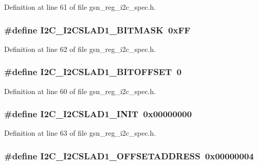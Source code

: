 Definition at line 61 of file gsn\_\-reg\_\-i2c\_\-spec.h.

\hypertarget{a00558_a4723244e82ce8c8eeae3907dbee0b0c8}{
\subsubsection[{I2C\_\-I2CSLAD1\_\-BITMASK}]{\setlength{\rightskip}{0pt plus 5cm}\#define I2C\_\-I2CSLAD1\_\-BITMASK~0xFF}}
\label{a00558_a4723244e82ce8c8eeae3907dbee0b0c8}


Definition at line 62 of file gsn\_\-reg\_\-i2c\_\-spec.h.

\hypertarget{a00558_a1f1b7194fe852224475768162fda21f1}{
\subsubsection[{I2C\_\-I2CSLAD1\_\-BITOFFSET}]{\setlength{\rightskip}{0pt plus 5cm}\#define I2C\_\-I2CSLAD1\_\-BITOFFSET~0}}
\label{a00558_a1f1b7194fe852224475768162fda21f1}


Definition at line 60 of file gsn\_\-reg\_\-i2c\_\-spec.h.

\hypertarget{a00558_a7974bec8b07391581991a473a3151ddc}{
\subsubsection[{I2C\_\-I2CSLAD1\_\-INIT}]{\setlength{\rightskip}{0pt plus 5cm}\#define I2C\_\-I2CSLAD1\_\-INIT~0x00000000}}
\label{a00558_a7974bec8b07391581991a473a3151ddc}


Definition at line 63 of file gsn\_\-reg\_\-i2c\_\-spec.h.

\hypertarget{a00558_a8f4ac9a844f60b127ba3feccd036f260}{
\subsubsection[{I2C\_\-I2CSLAD1\_\-OFFSETADDRESS}]{\setlength{\rightskip}{0pt plus 5cm}\#define I2C\_\-I2CSLAD1\_\-OFFSETADDRESS~0x00000004}}
\label{a00558_a8f4ac9a844f60b127ba3feccd036f260}


